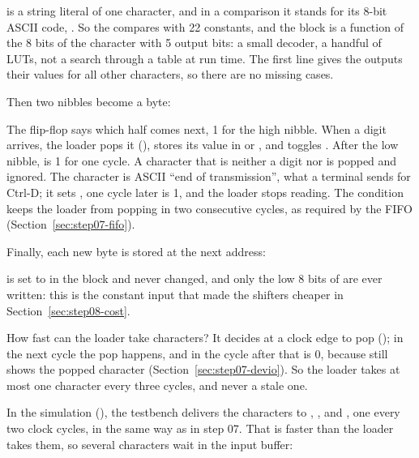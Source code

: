  is a string literal of one character, and in a comparison it stands
for its 8-bit ASCII code, . So the  compares
 with 22 constants, and the block is a function of the 8 bits
of the character with 5 output bits: a small decoder, a handful of LUTs, not
a search through a table at run time. The first line gives the outputs their
values for all other characters, so there are no missing cases.

Then two nibbles become a byte:


The flip-flop  says which half comes next, 1 for the high
nibble. When a digit arrives, the loader pops it (),
stores its value in  or , and toggles
. After the low nibble,  is 1 for one cycle. A
character that is neither a digit nor  is popped and ignored. The
character  is ASCII ``end of transmission'', what a terminal sends for
Ctrl-D; it sets , one cycle later  is 1, and the loader
stops reading. The condition  keeps the loader from popping
in two consecutive cycles, as required by the FIFO
(Section~\ref{sec:step07-fifo}).

Finally, each new byte is stored at the next address:


 is set to  in the  block and never
changed, and only the low 8 bits of  are ever written: this is
the constant input that made the shifters cheaper in
Section~\ref{sec:step08-cost}.

How fast can the loader take characters? It decides at a clock edge to pop
(); in the next cycle the pop happens, and in the cycle
after that  is 0, because  still shows the popped
character (Section~\ref{sec:step07-devio}). So the loader takes at most one
character every three cycles, and never a stale one.

In the simulation (), the testbench delivers the characters
 to , ,  and , one every two clock
cycles, in the same way as in step 07. That is faster than the loader takes
them, so several characters wait in the input buffer:


